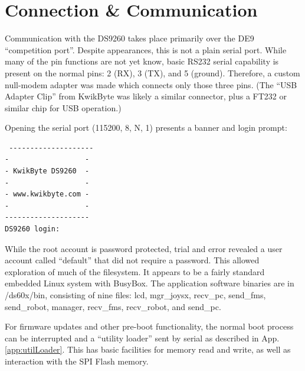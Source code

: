 \documentclass[]{article}
\begin{document}
\section{Connection \& Communication}
\par Communication with the DS9260 takes place primarily over the DE9 ``competition port''. Despite appearances, this is not a plain serial port. While many of the pin functions are not yet know, basic RS232 serial capability is present on the normal pins: 2 (RX), 3 (TX), and 5 (ground). Therefore, a custom null-modem adapter was made which connects only those three pins. (The ``USB Adapter Clip'' from KwikByte was likely a similar connector, plus a FT232 or similar chip for USB operation.)
\par Opening the serial port (115200, 8, N, 1) presents a banner and login prompt:
\begin{verbatim}
 --------------------
-                  -
- KwikByte DS9260  -
-                  -
- www.kwikbyte.com -
-                  -
--------------------
DS9260 login:
\end{verbatim}
While the root account is password protected, trial and error revealed a user account called ``default'' that did not require a  password. This allowed exploration of much of the filesystem. It appears to be a fairly standard embedded Linux system with BusyBox. The application software binaries are in /ds60x/bin, consisting of nine files: lcd, mgr\_joysx, recv\_pc, send\_fms, send\_robot, manager, recv\_fms, recv\_robot, and send\_pc.
\par For firmware updates and other pre-boot functionality, the normal boot process can be interrupted and a ``utility loader'' sent by serial as described in App. \ref{app:utilLoader}. This has basic facilities for memory read and write, as well as interaction with the SPI Flash memory.
\end{document}
